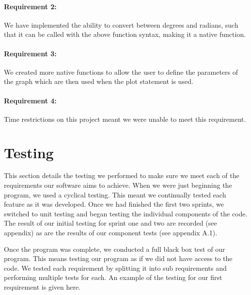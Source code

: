 \documentclass[a4paper, oneside, 11pt]{report}
\begin{document}
\subsubsection{Requirement 2: }
We have implemented the ability to convert between degrees and radians, such that it can be called with the above function syntax, making it a native function.

\subsubsection{Requirement 3: }
We created more native functions to allow the user to define the parameters of the graph which are then used when the plot statement is used.

\subsubsection{Requirement 4: }
Time restrictions on this project meant we were unable to meet this requirement.

\chapter{Testing}

This section details the testing we performed to make sure we meet each of the requirements our software aims to achieve. When we were just beginning the program, we used a cyclical testing. This meant we continually tested each feature as it was developed. Once we had finished the first two sprints, we switched to unit testing and began testing the individual components of the code. The result of our initial testing for sprint one and two are recorded (see appendix) as are the results of our component tests (see appendix A.1).

Once the program was complete, we conducted a full black box test of our program. This means testing our program as if we did not have access to the code. We tested each requirement by splitting it into sub requirements and performing multiple tests for each. An example of the testing for our first requirement is given here.
\end{document}

